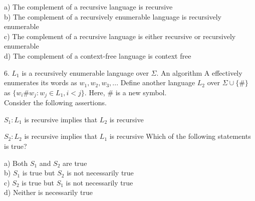 \documentclass[11pt]{article}
\begin{document}
\hspace*{0.5cm} a) The complement of a recursive language is recursive\\
\hspace*{0.5cm} b) The complement of a recursively enumerable language is recursively enumerable\\
\hspace*{0.5cm} c) The complement of a recursive language is either recursive or recursively enumerable\\
\hspace*{0.5cm} d) The complement of a context-free language is context free\\
\vspace*{0.2cm}

\hspace*{-0.4cm}
6. $L _{1}$ is a recursively enumerable language over $\Sigma$. An algorithm A effectively enumerates its words
as $w _{1}, w _{2}, w _{3}, . . .$ Define another language $L _{2}$ over $\Sigma \cup \{\#\}$ as $\{w _{i} \# w _{j}: w _{j} \in L _{1}, i < j\}$. Here, $\#$ is a new symbol.\\

\vspace*{0.1cm}
\hspace*{0.5cm} Consider the following assertions.\\
\vspace*{0.1cm}

\hspace*{0.5cm} $S _{1}: L _{1}$ is recursive implies that $L _{2}$ is recursive\\
\vspace*{0.1cm}

\hspace*{0.5cm} $S _{2}: L _{2}$ is recursive implies that $L _{1}$ is recursive
Which of the following statements is true?\\
\vspace*{0.1cm}

\hspace*{0.5cm} a) Both $S _{1}$ and $S _{2}$ are true\\
\hspace*{0.5cm} b) $S _{1}$ is true but $S _{2}$ is not necessarily true\\
\hspace*{0.5cm} c) $S _{2}$ is true but $S _{1}$ is not necessarily true\\
\hspace*{0.5cm} d) Neither is necessarily true\\
\vspace*{0.2cm}
\end{document}
